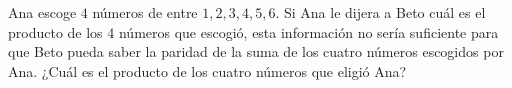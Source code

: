 Ana escoge $4$ números de entre $1, 2, 3, 4, 5, 6$. Si Ana le dijera a Beto cuál es el producto de los $4$ números que escogió, esta información no sería suficiente para que Beto pueda saber la paridad de la suma de los cuatro números escogidos por Ana. ¿Cuál es el producto de los cuatro números que eligió Ana?